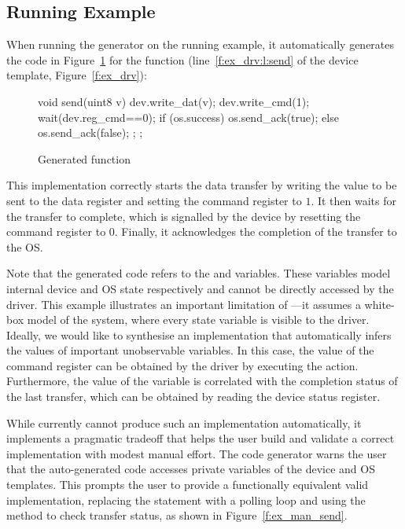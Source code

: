 \subsection{Running Example}

When running the generator on the running example, it automatically generates the code in Figure~\ref{f:ex_gen_send} for the  function (line~\ref{f:ex_drv:l:send} of the device template, Figure~\ref{f:ex_drv}):

\begin{figure}
\begin{tsllisting}
void send(uint8 v){
    dev.write_dat(v);
    dev.write_cmd(1);
    wait(dev.reg_cmd==0);
    if (os.success) {
        os.send_ack(true);
    } else {
        os.send_ack(false);
    };
};
\end{tsllisting}
\caption{Generated  function}
\label{f:ex_gen_send}
\end{figure}

This implementation correctly starts the data transfer by writing the value to be sent to the data register and setting the command register to $1$.  It then waits for the transfer to complete, which is signalled by the device by resetting the command register to $0$.  Finally, it acknowledges the completion of the transfer to the OS.

Note that the generated code refers to the  and  variables.  These variables model internal device and OS state respectively and cannot be directly accessed by the driver.  This example illustrates an important limitation of \termite---it assumes a white-box model of the system, where every state variable is visible to the driver.  Ideally, we would like to synthesise an implementation that automatically infers the values of important unobservable variables.  In this case, the value of the command register can be obtained by the driver by executing the  action.  Furthermore, the value of the  variable is correlated with the completion status of the last transfer, which can be obtained by reading the device status register.

While \termite currently cannot produce such an implementation automatically, it implements a pragmatic tradeoff that helps the user build and validate a correct implementation with modest manual effort.  The code generator warns the user that the auto-generated code accesses  private variables of the device and OS templates.  This prompts the user to provide a functionally equivalent valid implementation, replacing the  statement with a polling loop and using the  method to check transfer status, as shown in Figure~\ref{f:ex_man_send}.

